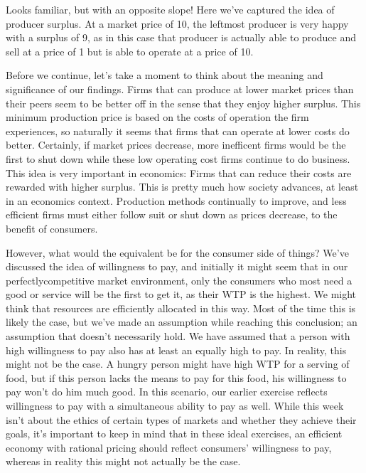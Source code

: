 \documentclass[letterpaper,10pt,english]{jupyterBook}
\begin{document}
\sphinxAtStartPar
Looks familiar, but with an opposite slope! Here we’ve captured the idea of producer surplus. At a market price of 10, the leftmost producer is very happy with a surplus of 9, as in this case that producer is actually able to produce and sell at a price of 1 but is able to operate at a price of 10.

\sphinxAtStartPar
Before we continue, let’s take a moment to think about the meaning and significance of our findings. Firms that can produce at lower market prices than their peers seem to be better off in the sense that they enjoy higher surplus. This minimum production price is based on the costs of operation the firm experiences, so naturally it seems that firms that can operate at lower costs do better. Certainly, if market prices decrease, more inefficent firms would be the first to shut down while these low operating cost firms continue to do business. This idea is very important in economics: Firms that can reduce their costs are rewarded with higher surplus. This is pretty much how society advances, at least in an economics context. Production methods continually to improve, and less efficient firms must either follow suit or shut down as prices decrease, to the benefit of consumers.

\sphinxAtStartPar
However, what would the equivalent be for the consumer side of things? We’ve discussed the idea of willingness to pay, and initially it might seem that in our perfectly\sphinxhyphen{}competitive market environment, only the consumers who most need a good or service will be the first to get it, as their WTP is the highest. We might think that resources are efficiently allocated in this way. Most of the time this is likely the case, but we’ve made an assumption while reaching this conclusion; an assumption that doesn’t necessarily hold. We have assumed that a person with high willingness to pay also has at least an equally high  to pay. In reality, this might not be the case. A hungry person might have high WTP for a serving of food, but if this person lacks the means to pay for this food, his willingness to pay won’t do him much good. In this scenario, our earlier exercise reflects willingness to pay with a simultaneous ability to pay as well. While this week isn’t about the ethics of certain types of markets and whether they achieve their goals, it’s important to keep in mind that in these ideal exercises, an efficient economy with rational pricing should reflect consumers’ willingness to pay, whereas in reality this might not actually be the case.
\end{document}
